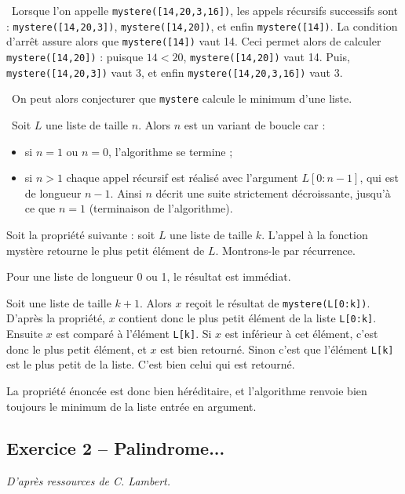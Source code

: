 \ifprof
\begin{corrige}

\question\ 
Lorsque l'on appelle \texttt{mystere([14,20,3,16])}, les appels récursifs successifs sont : 
\texttt{mystere([14,20,3])}, \texttt{mystere([14,20])}, et enfin \texttt{mystere([14])}. La condition d'arrêt assure 
alors que \texttt{mystere([14])} vaut 14. Ceci permet alors de calculer \texttt{mystere([14,20])} : puisque $14<20$, 
\texttt{mystere([14,20])} vaut 14. Puis, \texttt{mystere([14,20,3])} vaut 3, et enfin 
\texttt{mystere([14,20,3,16])} vaut 3.

\question\ 
On peut alors conjecturer que \texttt{mystere} calcule le minimum d'une liste.
\setcounter{subparagraph}{3}

\question\ 
Soit $L$ une liste de taille $n$. Alors $n$ est un variant de boucle car : 
\begin{itemize}
\item si $n=1$ ou $n=0$, l'algorithme se termine ;
\item si $n>1$ chaque appel récursif est réalisé avec l'argument $L[0:n-1]$, qui est de longueur $n-1$. Ainsi $n$ 
décrit une suite strictement décroissante, jusqu'à ce que $n=1$ (terminaison de l'algorithme). 
\end{itemize}

\vspace{.25cm}

Soit la propriété suivante : soit $L$ une liste de taille $k$. L'appel à la fonction mystère retourne le plus petit 
élément de $L$. Montrons-le par récurrence.

Pour une liste de longueur 0 ou 1, le résultat est immédiat.

Soit une liste de taille $k+1$.  Alors $x$ reçoit le résultat de \texttt{mystere(L[0:k])}. D'après la propriété, $x$ 
contient donc le plus petit élément de la liste \texttt{L[0:k]}. Ensuite $x$ est comparé à l'élément \texttt{L[k]}. Si 
$x$ est inférieur à cet élément, c'est donc le plus petit élément, et $x$ est bien retourné. Sinon c'est que l'élément 
\texttt{L[k]} est le plus petit de la liste. C'est bien celui qui est retourné. 

La propriété énoncée est donc bien héréditaire, et l'algorithme renvoie bien toujours le minimum de la liste entrée en 
argument.

\setcounter{question}{0}

\end{corrige}
\else
\fi

\subsection*{Exercice 2 -- Palindrome...}
\setcounter{exo}{0}
\ifprof
\else
\textit{D'après ressources de C. Lambert.}

